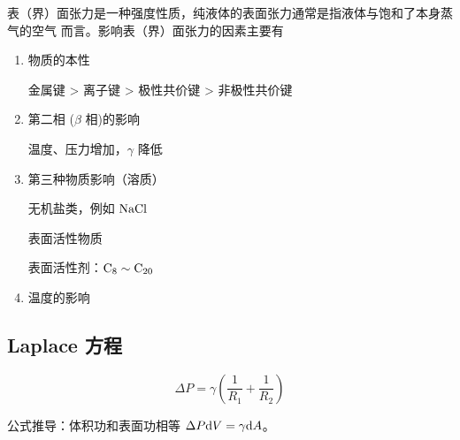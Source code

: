 表（界）面张力是一种强度性质，纯液体的表面张力通常是指液体与饱和了本身蒸气的空气
而言。影响表（界）面张力的因素主要有

\begin{enumerate}
    \item 物质的本性 \par
          金属键 > 离子键 > 极性共价键 > 非极性共价键
    \item 第二相 ($\beta$ 相)的影响 \par
          温度、压力增加，$\gamma$ 降低
    \item 第三种物质影响（溶质）\par
          无机盐类，例如 $\ce{NaCl}$ \par
          表面活性物质 \par
          表面活性剂：$\ce{C8} \sim \ce{C_{20}}$
    \item 温度的影响
\end{enumerate}


\subsection{Laplace 方程}


\begin{equation}
    \Delta P = \gamma \left(\frac{1}{R_1} + \frac{1}{R_2}\right)
\end{equation}

公式推导：体积功和表面功相等 $\Delta P \mathrm{d} V = \gamma \mathrm{d} A$。
